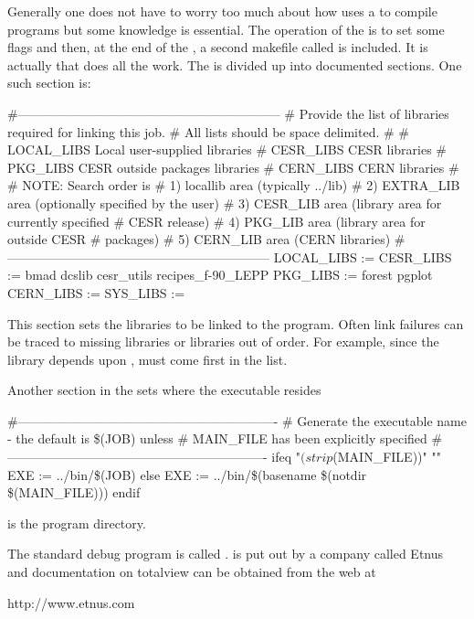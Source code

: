 Generally one does not have to worry too much about how 
uses a  to compile programs but some knowledge is
essential. The operation of the  is to set some flags and
then, at the end of the , a second makefile called
 is included. It is actually  that does all the
work. The  is divided up into documented sections.
One such section is:
\begin{example}
  #--------------------------------------------------------------
  # Provide the list of libraries required for linking this job.
  # All lists should be space delimited.
  #
  # LOCAL_LIBS    Local user-supplied libraries
  # CESR_LIBS     CESR libraries
  # PKG_LIBS      CESR outside packages libraries
  # CERN_LIBS     CERN libraries
  #
  # NOTE:  Search order is 
  #        1) locallib area  (typically ../lib)
  #        2) EXTRA_LIB area (optionally specified by the user)
  #        3) CESR_LIB area  (library area for currently specified 
  #                           CESR release)
  #        4) PKG_LIB area   (library area for outside CESR 
  #                           packages)
  #        5) CERN_LIB area  (CERN libraries)
  #--------------------------------------------------------------
  LOCAL_LIBS := 
  CESR_LIBS  := bmad dcslib cesr_utils recipes_f-90_LEPP
  PKG_LIBS   := forest pgplot
  CERN_LIBS  :=
  SYS_LIBS   :=
\end{example}
This section sets the libraries to be linked to the program. Often
link failures can be traced to missing libraries or libraries out of
order. For example, since the  library depends upon
,  must come first in the  list.

Another section in the  sets where the executable resides
\begin{example}
  #-------------------------------------------------------------
  # Generate the executable name - the default is \$(JOB) unless  
  # MAIN_FILE has been explicitly specified
  #-------------------------------------------------------------
  ifeq "$(strip $(MAIN_FILE))" ""
          EXE := ../bin/\$(JOB)
  else
    EXE := ../bin/\$(basename \$(notdir \$(MAIN_FILE)))
  endif
\end{example}
 is the program directory. 

The standard debug program is called .  is
put out by a company called Etnus and documentation on totalview can
be obtained from the web at
\begin{example}
  http://www.etnus.com
\end{example}

